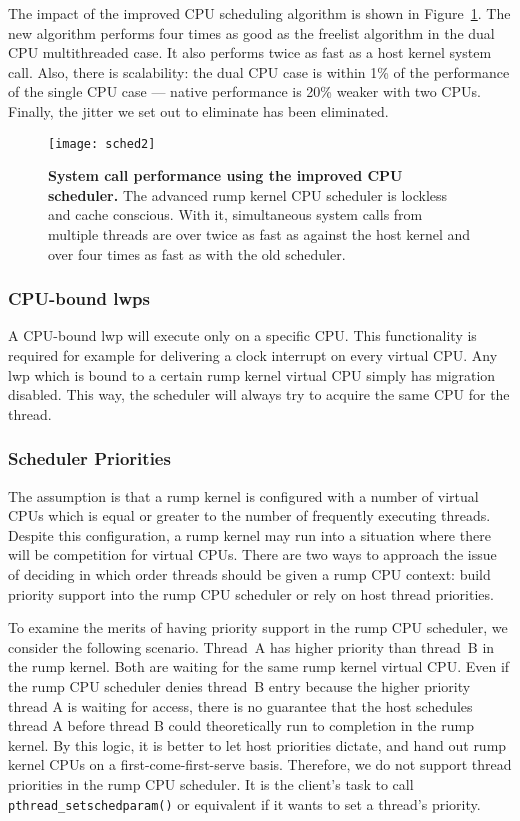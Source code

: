 The impact of the improved CPU scheduling algorithm is shown in
Figure~\ref{fig:syscall_proalgo}.  The new algorithm performs four
times as good as the freelist algorithm in the dual CPU multithreaded
case.  It also performs twice as fast as a host kernel system call.
Also, there is scalability: the dual CPU case is within 1\% of the
performance of the single CPU case --- native performance is 20\%
weaker with two CPUs.  Finally, the jitter we set out to eliminate
has been eliminated.

\begin{figure}[t]
\texttt{[image: sched2]}
\caption[System call performance using the improved CPU scheduler]{
\textbf{System call performance using the improved CPU scheduler.}
The advanced rump kernel CPU scheduler is lockless and cache conscious.
With it, simultaneous system calls from multiple threads are over
twice as fast as against the host kernel and over four times as fast as
with the old scheduler.}
\label{fig:syscall_proalgo}
\end{figure}

\subsubsection*{CPU-bound lwps}

A CPU-bound lwp will execute only on a specific CPU.  This
functionality is required for example for delivering a clock
interrupt on every virtual CPU.  Any lwp which is bound to a certain
rump kernel virtual CPU simply has migration disabled.  This way,
the scheduler will always try to acquire the same CPU for the
thread.

\subsubsection*{Scheduler Priorities}

The assumption is that a rump kernel is configured with a number
of virtual CPUs which is equal or greater to the number of frequently
executing threads.  Despite this configuration, a rump kernel may run
into a situation where there will be competition for virtual CPUs.
There are two ways to approach the issue of deciding in which order
threads should be given a rump CPU context: build priority support into
the rump CPU scheduler or rely on host thread priorities.

To examine the merits of having priority support in the rump CPU
scheduler, we consider the following scenario.  Thread~A has higher
priority than thread~B in the rump kernel.  Both are waiting for
the same rump kernel virtual CPU.  Even if the rump CPU scheduler
denies thread~B entry because the higher priority thread A is
waiting for access, there is no guarantee that the host schedules
thread A before thread B could theoretically run to completion in
the rump kernel.  By this logic, it is better to let host priorities
dictate, and hand out rump kernel CPUs on a first-come-first-serve
basis.  Therefore, we do not support thread priorities in the rump
CPU scheduler.  It is the client's task to call
\verb+pthread_setschedparam()+ or equivalent if it wants to set a
thread's priority.

